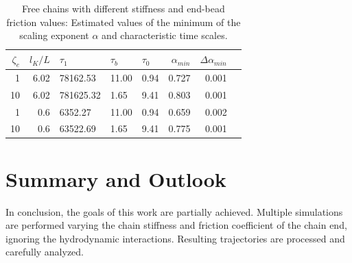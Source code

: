\documentclass[
    paper=A4,pagesize=automedia,fontsize=12pt,
    BCOR=15mm,DIV=22,
    twoside,headinclude,footinclude=false,
    fleqn,             %
    bibliography=totocnumbered,          %
    listof=totoc,                %
    listof=flat,                 %
    cleardoublepage=empty      %
    numbers=endperiod
]{scrartcl}
\begin{document}
\begin{table}[p]
    \centering
    
    \begin{tabular}{rrlllrrr}
        \toprule
        $\zeta_e$ & $l_K/L$ & $\tau_1$ & $\tau_b$ & $\tau_0$ & $\alpha_{min}$ & $\Delta \alpha_{min}$ \\
        \midrule
        1 & 6.02 & 78162.53 & 11.00 & 0.94 & 0.727 & 0.001\\
        10 & 6.02 & 781625.32 & 1.65 & 9.41 & 0.803 & 0.001\\
        1 & 0.6 & 6352.27 & 11.00 & 0.94 & 0.659 & 0.002\\
        10 & 0.6 & 63522.69 & 1.65 & 9.41 & 0.775 & 0.001\\
        \bottomrule
        \end{tabular}
    \caption{
        Free chains with different stiffness and end-bead friction values: 
        Estimated values of the minimum of the scaling exponent $\alpha$ and
        characteristic time scales.
    }
    \label{table:free_chain_alpha_estimations}
\end{table}

\section{Summary and Outlook}
In conclusion, the goals of this work are partially achieved. Multiple simulations 
are performed varying the chain stiffness and friction coefficient of the chain end, 
ignoring the hydrodynamic interactions. Resulting trajectories are processed and 
carefully analyzed. 
\end{document}
